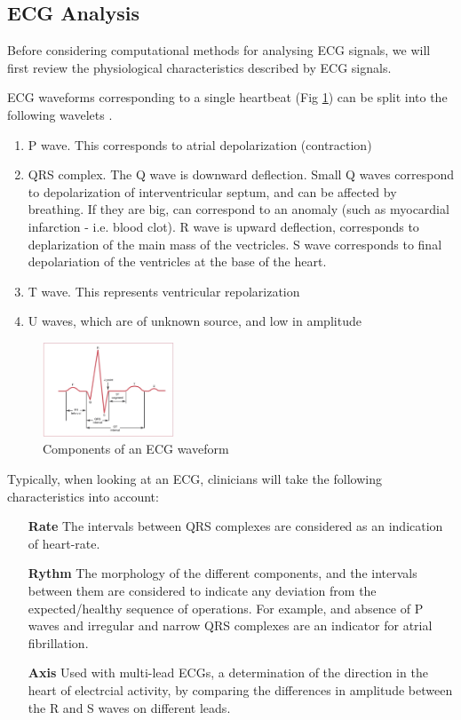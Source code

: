 \documentclass[9pt,conference]{IEEEtran}
\begin{document}
\subsection{ECG Analysis}
Before considering computational methods for analysing ECG signals, we will first review the physiological characteristics described by ECG signals.

ECG waveforms corresponding to a single heartbeat (Fig \ref{fig:ecg_components}) can be split into the following wavelets \cite{cardioBook}.

\begin{enumerate}
    \item P wave. This corresponds to atrial depolarization (contraction) 
    \item QRS complex. The Q wave is downward deflection. Small Q waves correspond to depolarization of interventricular septum, and can be affected by breathing. If they are big, can correspond to an anomaly (such as myocardial infarction - i.e. blood clot). R wave is upward deflection, corresponds to deplarization of the main mass of the vectricles. S wave corresponds to final depolariation of the ventricles at the base of the heart.
    \item T wave. This represents ventricular repolarization
    \item U waves, which are of unknown source, and low in amplitude
\end{enumerate}

\begin{figure}[H]
\centering\includegraphics[width = 0.35\textwidth]{ecg_components.jpg}
\caption{\label{fig:ecg_components} Components of an ECG waveform}
\end{figure}

Typically, when looking at an ECG, clinicians will take the following characteristics into account:

\begin{enumerate}
    \item[\textbf{Rate}] The intervals between QRS complexes are considered as an indication of heart-rate.
    \item[\textbf{Rythm}] The morphology of the different components, and the intervals between them are considered to indicate any deviation from the expected/healthy sequence of operations. For example, and absence of P waves and irregular and narrow QRS complexes are an indicator for atrial fibrillation.
    \item[\textbf{Axis}] Used with multi-lead ECGs, a determination of the direction in the heart of electrcial activity, by comparing the differences in amplitude between the R and S waves on different leads.
\end{enumerate}
\end{document}
